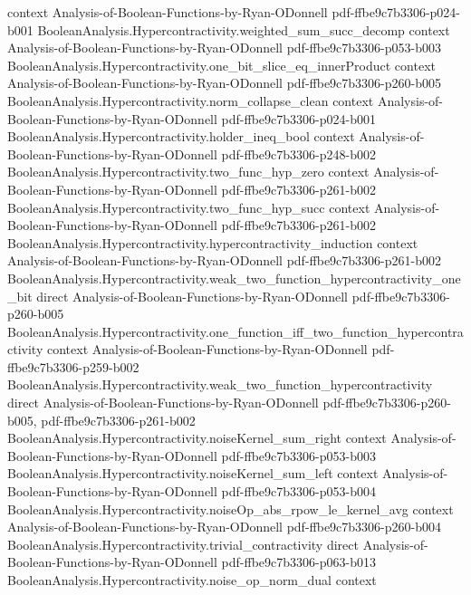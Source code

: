 \begin{theorem}
  {context}
  {Analysis-of-Boolean-Functions-by-Ryan-ODonnell}
  {pdf-ffbe9c7b3306-p024-b001}
\proofstep
  {BooleanAnalysis.Hypercontractivity.weighted_sum_succ_decomp}
  {context}
  {Analysis-of-Boolean-Functions-by-Ryan-ODonnell}
  {pdf-ffbe9c7b3306-p053-b003}
\proofstep
  {BooleanAnalysis.Hypercontractivity.one_bit_slice_eq_innerProduct}
  {context}
  {Analysis-of-Boolean-Functions-by-Ryan-ODonnell}
  {pdf-ffbe9c7b3306-p260-b005}
\proofstep
  {BooleanAnalysis.Hypercontractivity.norm_collapse_clean}
  {context}
  {Analysis-of-Boolean-Functions-by-Ryan-ODonnell}
  {pdf-ffbe9c7b3306-p024-b001}
\proofstep
  {BooleanAnalysis.Hypercontractivity.holder_ineq_bool}
  {context}
  {Analysis-of-Boolean-Functions-by-Ryan-ODonnell}
  {pdf-ffbe9c7b3306-p248-b002}
\proofstep
  {BooleanAnalysis.Hypercontractivity.two_func_hyp_zero}
  {context}
  {Analysis-of-Boolean-Functions-by-Ryan-ODonnell}
  {pdf-ffbe9c7b3306-p261-b002}
\proofstep
  {BooleanAnalysis.Hypercontractivity.two_func_hyp_succ}
  {context}
  {Analysis-of-Boolean-Functions-by-Ryan-ODonnell}
  {pdf-ffbe9c7b3306-p261-b002}
\proofstep
  {BooleanAnalysis.Hypercontractivity.hypercontractivity_induction}
  {context}
  {Analysis-of-Boolean-Functions-by-Ryan-ODonnell}
  {pdf-ffbe9c7b3306-p261-b002}
\proofstep
  {BooleanAnalysis.Hypercontractivity.weak_two_function_hypercontractivity_one_bit}
  {direct}
  {Analysis-of-Boolean-Functions-by-Ryan-ODonnell}
  {pdf-ffbe9c7b3306-p260-b005}
\proofstep
  {BooleanAnalysis.Hypercontractivity.one_function_iff_two_function_hypercontractivity}
  {context}
  {Analysis-of-Boolean-Functions-by-Ryan-ODonnell}
  {pdf-ffbe9c7b3306-p259-b002}
\proofstep
  {BooleanAnalysis.Hypercontractivity.weak_two_function_hypercontractivity}
  {direct}
  {Analysis-of-Boolean-Functions-by-Ryan-ODonnell}
  {pdf-ffbe9c7b3306-p260-b005,
    pdf-ffbe9c7b3306-p261-b002}
\proofstep
  {BooleanAnalysis.Hypercontractivity.noiseKernel_sum_right}
  {context}
  {Analysis-of-Boolean-Functions-by-Ryan-ODonnell}
  {pdf-ffbe9c7b3306-p053-b003}
\proofstep
  {BooleanAnalysis.Hypercontractivity.noiseKernel_sum_left}
  {context}
  {Analysis-of-Boolean-Functions-by-Ryan-ODonnell}
  {pdf-ffbe9c7b3306-p053-b004}
\proofstep
  {BooleanAnalysis.Hypercontractivity.noiseOp_abs_rpow_le_kernel_avg}
  {context}
  {Analysis-of-Boolean-Functions-by-Ryan-ODonnell}
  {pdf-ffbe9c7b3306-p260-b004}
\proofstep
  {BooleanAnalysis.Hypercontractivity.trivial_contractivity}
  {direct}
  {Analysis-of-Boolean-Functions-by-Ryan-ODonnell}
  {pdf-ffbe9c7b3306-p063-b013}
\proofstep
  {BooleanAnalysis.Hypercontractivity.noise_op_norm_dual}
  {context}

\end{theorem}
